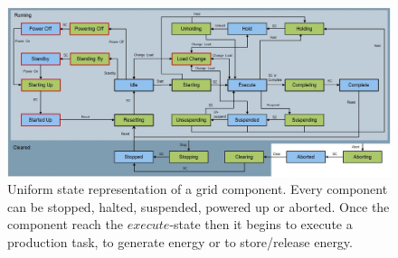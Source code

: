 %
\begin{figure}[h!]
\includegraphics[scale=.40]{images/StateMachine_EFlex}
%
%
\caption{Uniform state representation of a grid component. Every component can be stopped, halted, suspended, powered up or aborted. Once the component reach the $execute$-state then it begins to execute a production task, to generate energy or to store/release energy.}
\label{fig:state_chart}       %
\end{figure}



